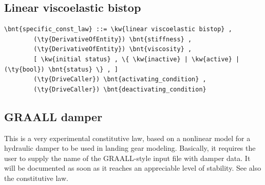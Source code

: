 \subsection{Linear viscoelastic bistop}
\begin{Verbatim}[commandchars=\\\{\}]
    \bnt{specific_const_law} ::= \kw{linear viscoelastic bistop} ,
        (\ty{DerivativeOfEntity}) \bnt{stiffness} ,
        (\ty{DerivativeOfEntity}) \bnt{viscosity} ,
        [ \kw{initial status} , \{ \kw{inactive} | \kw{active} | (\ty{bool}) \bnt{status} \} , ]
        (\ty{DriveCaller}) \bnt{activating_condition} ,
        (\ty{DriveCaller}) \bnt{deactivating_condition}
\end{Verbatim}
  
\subsection{GRAALL damper}
This is a very experimental constitutive law, based on a nonlinear model
for a hydraulic damper to be used in landing gear modeling.
Basically, it requires the user to supply the name of the GRAALL-style 
input file with damper data.
It will be documented as soon as it reaches an appreciable level of
stability.
See also the 
constitutive law.


